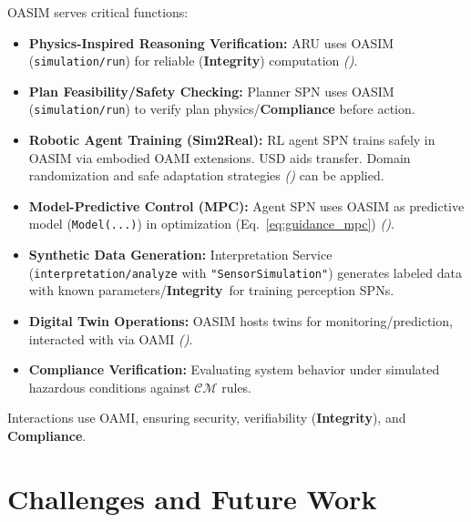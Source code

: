 \documentclass[12pt,a4paper]{report}
\renewcommand{\citep}[1]{\textit{\scriptsize{(\cite{#1})}}}
\newcommand{\Integrity}{\textbf{Integrity}}
\begin{document}
	OASIM serves critical functions:
	\begin{itemize}
		\item \textbf{Physics-Inspired Reasoning Verification:} ARU uses OASIM (\texttt{simulation/run}) for reliable (\Integrity) computation \citep{Cao_PhyDRL_2024}.
		\item \textbf{Plan Feasibility/Safety Checking:} Planner SPN uses OASIM (\texttt{simulation/run}) to verify plan physics/\textbf{Compliance} before action.
		\item \textbf{Robotic Agent Training (Sim2Real):} RL agent SPN trains safely in OASIM via embodied OAMI extensions. USD aids transfer. Domain randomization and safe adaptation strategies \citep{Josifovski_SCDA_2025} can be applied.
		\item \textbf{Model-Predictive Control (MPC):} Agent SPN uses OASIM as predictive model (\texttt{Model(...)}) in optimization (Eq.~\ref{eq:guidance_mpc}) \citep{Berg2025DigitalTwin}.
		\item \textbf{Synthetic Data Generation:} Interpretation Service (\texttt{interpretation/analyze} with \texttt{"SensorSimulation"}) generates labeled data with known parameters/\Integrity\ for training perception SPNs.
		\item \textbf{Digital Twin Operations:} OASIM hosts twins for monitoring/prediction, interacted with via OAMI \citep{Li2025DigitalTwins, Berg2025DigitalTwin}.
		\item \textbf{Compliance Verification:} Evaluating system behavior under simulated hazardous conditions against $\mathcal{CM}$ rules.
	\end{itemize}
	Interactions use OAMI, ensuring security, verifiability (\Integrity), and \textbf{Compliance}.
	
	\section{Challenges and Future Work}
	\label{app:oasim_challenges}
	
\end{document}
